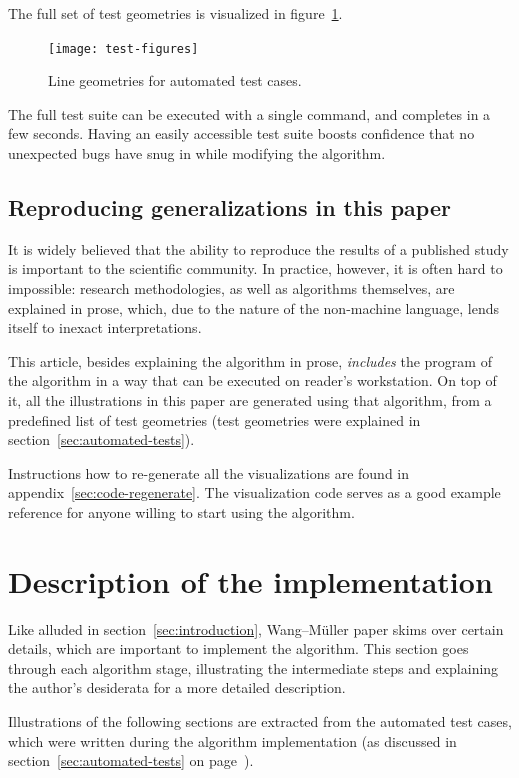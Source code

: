 \documentclass[a4paper]{article}
\newcommand{\onpage}[1]{\ref{#1} on page~\pageref{#1}}
\newcommand{\WM}{Wang--M{\"u}ller}
\begin{document}
The full set of test geometries is visualized in
figure~\ref{fig:test-figures}.

\begin{figure}[h]
    \centering
    \texttt{[image: test-figures]}
    \caption{Line geometries for automated test cases.}
    \label{fig:test-figures}
\end{figure}

The full test suite can be executed with a single command, and completes in a
few seconds. Having an easily accessible test suite boosts confidence that no
unexpected bugs have snug in while modifying the algorithm.

\subsection{Reproducing generalizations in this paper}
\label{sec:reproducing-the-paper}

It is widely believed that the ability to reproduce the results of a published
study is important to the scientific community. In practice, however, it is
often hard to impossible: research methodologies, as well as algorithms
themselves, are explained in prose, which, due to the nature of the non-machine
language, lends itself to inexact interpretations.

This article, besides explaining the algorithm in prose, \emph{includes} the
program of the algorithm in a way that can be executed on reader's workstation.
On top of it, all the illustrations in this paper are generated using that
algorithm, from a predefined list of test geometries (test geometries were
explained in section~\ref{sec:automated-tests}).

Instructions how to re-generate all the visualizations are found in
appendix~\ref{sec:code-regenerate}. The visualization code serves as a good
example reference for anyone willing to start using the algorithm.

\section{Description of the implementation}

Like alluded in section~\ref{sec:introduction}, {\WM} paper skims over
certain details, which are important to implement the algorithm. This section
goes through each algorithm stage, illustrating the intermediate steps and
explaining the author's desiderata for a more detailed description.

Illustrations of the following sections are extracted from the automated test
cases, which were written during the algorithm implementation (as discussed in
section~\onpage{sec:automated-tests}).
\end{document}
